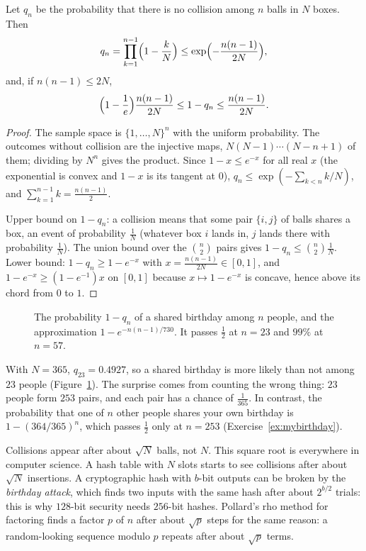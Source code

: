 \begin{proposition}\label{prop:birthday}
Let $q_n$ be the probability that there is no collision among $n$ balls in $N$ boxes. Then
\[
q_n=\prod_{k=1}^{n-1}\Bigl(1-\frac kN\Bigr)\le\exp\Bigl(-\frac{n(n-1)}{2N}\Bigr),
\]
and, if $n(n-1)\le2N$,
\[
\Bigl(1-\frac1e\Bigr)\frac{n(n-1)}{2N}\le1-q_n\le\frac{n(n-1)}{2N}.
\]
\end{proposition}
\begin{proof}
The sample space is $\{1,\dots,N\}^n$ with the uniform probability. The outcomes without collision are the
injective maps, $N(N-1)\cdots(N-n+1)$ of them; dividing by $N^n$ gives the product. Since $1-x\le e^{-x}$ for all
real $x$ (the exponential is convex and $1-x$ is its tangent at $0$), $q_n\le\exp(-\sum_{k<n}k/N)$, and
$\sum_{k=1}^{n-1}k=\frac{n(n-1)}2$.

Upper bound on $1-q_n$: a collision means that some pair $\{i,j\}$ of balls shares a box, an event of probability
$\frac1N$ (whatever box $i$ lands in, $j$ lands there with probability $\frac1N$). The union bound over the
$\binom n2$ pairs gives $1-q_n\le\binom n2\frac1N$. Lower bound: $1-q_n\ge1-e^{-x}$ with $x=\frac{n(n-1)}{2N}\in[0,1]$,
and $1-e^{-x}\ge(1-e^{-1})x$ on $[0,1]$ because $x\mapsto1-e^{-x}$ is concave, hence above its chord from $0$ to $1$.
\end{proof}

\begin{figure}[ht]
\centering
{}
\caption{The probability $1-q_n$ of a shared birthday among $n$ people, and the approximation $1-e^{-n(n-1)/730}$.
It passes $\frac12$ at $n=23$ and $99\%$ at $n=57$.}
\label{fig:birthday}
\end{figure}

With $N=365$, $q_{23}=0.4927$, so a shared birthday is more likely than not among $23$ people
(Figure~\ref{fig:birthday}). The surprise comes from counting the wrong thing: $23$ people form $253$ pairs, and
each pair has a chance of $\frac1{365}$. In contrast, the probability that one of $n$ other people shares your own
birthday is $1-(364/365)^n$, which passes $\frac12$ only at $n=253$ (Exercise~\ref{ex:mybirthday}).

\begin{beauty}
Collisions appear after about $\sqrt N$ balls, not $N$. This square root is everywhere in computer science.
A hash table with $N$ slots starts to see collisions after about $\sqrt N$ insertions. A cryptographic hash with
$b$-bit outputs can be broken by the \emph{birthday attack}, which finds two inputs with the same hash after
about $2^{b/2}$ trials: this is why $128$-bit security needs $256$-bit hashes. Pollard's rho method for factoring finds a factor $p$ of $n$ after about $\sqrt p$ steps for the same reason: a random-looking sequence
modulo $p$ repeats after about $\sqrt p$ terms.
\end{beauty}

